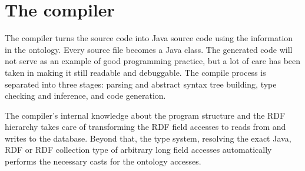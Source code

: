 \newcommand{\caret}{{\large\textbf{\textasciicircum}}}

\section{The \vonda compiler}

The compiler turns the \vonda source code into Java source code using the information
in the ontology. Every source file becomes a Java class. The generated code
will not serve as an example of good programming practice, but a lot of care
has been taken in making it still readable and debuggable. The
compile process is separated into three stages: parsing and abstract syntax tree building,
type checking and inference, and code generation.

The \vonda compiler's internal knowledge about the program structure and the
RDF hierarchy takes care of transforming the RDF field accesses to reads from and
writes to the database. Beyond that, the type system, resolving the exact
Java, RDF or RDF collection type of arbitrary long field accesses automatically
performs the necessary casts for the ontology accesses.

%
%
%
%

